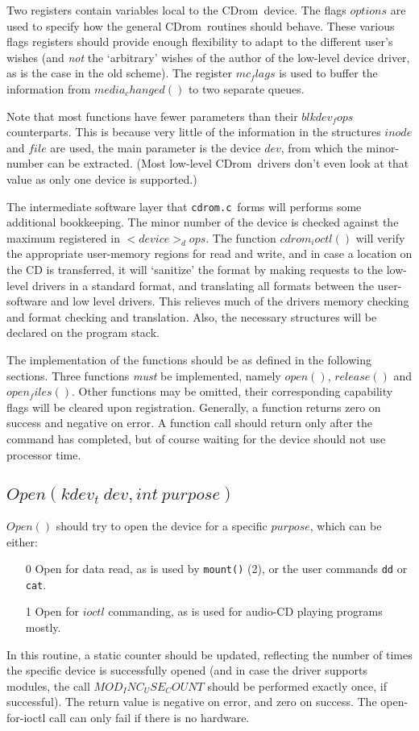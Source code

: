 \documentclass{article}
\def\cdrom{{\sc CDrom}}
\def\cdromc{{\tt cdrom.c}}
\begin{document}
Two registers contain variables local to the \cdrom\ device. The flags
$options$ are used to specify how the general \cdrom\ routines
should behave. These various flags registers should provide enough
flexibility to adapt to the different user's wishes (and {\em not\/}
the `arbitrary' wishes of the author of the low-level device driver,
as is the case in the old scheme). The register $mc_flags$ is used to
buffer the information from $media_changed()$ to two separate queues. 

Note that most functions have fewer parameters than their
$blkdev_fops$ counterparts. This is because very little of the
information in the structures $inode$ and $file$ are used, the main
parameter is the device $dev$, from which the minor-number can be
extracted. (Most low-level \cdrom\ drivers don't even look at that value
as only one device is supported.)

The intermediate software layer that \cdromc\ forms will performs some
additional bookkeeping. The minor number of the device is checked
against the maximum registered in $<device>_dops$. The function
$cdrom_ioctl()$ will verify the appropriate user-memory regions for
read and write, and in case a location on the CD is transferred, it
will `sanitize' the format by making requests to the low-level drivers
in a standard format, and translating all formats between the
user-software and low level drivers. This relieves much of the drivers
memory checking and format checking and translation. Also, the
necessary structures will be declared on the program stack.

The implementation of the functions should be as defined in the
following sections. Three functions {\em must\/} be implemented,
namely $open()$, $release()$ and $open_files()$. Other functions may
be omitted, their corresponding capability flags will be cleared upon
registration. Generally, a function returns zero on success and
negative on error. A function call should return only after the
command has completed, but of course waiting for the device should not
use processor time.

\subsection{$Open(kdev_t\ dev, int\ purpose)$}

$Open()$ should try to open the device for a specific $purpose$, which
can be either:
\begin{itemize}
\item[0] Open for data read, as is used by {\tt mount()} (2), or the
user commands {\tt dd} or {\tt cat}.  
\item[1] Open for $ioctl$ commanding, as is used for audio-CD playing
programs mostly. 
\end{itemize}
In this routine, a static counter should be updated, reflecting the
number of times the specific device is successfully opened (and in
case the driver supports modules, the call $MOD_INC_USE_COUNT$
should be performed exactly once, if successful). The return value is
negative on error, and zero on success. The open-for-ioctl call can
only fail if there is no hardware.
\end{document}
